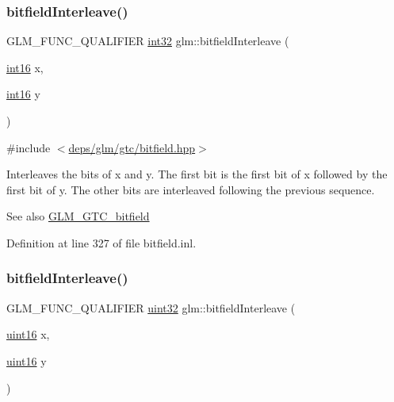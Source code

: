 \subsubsection{\texorpdfstring{bitfield\+Interleave()}{bitfieldInterleave()}\hspace{0.1cm}{\footnotesize\ttfamily [3/16]}}
{\footnotesize\ttfamily G\+L\+M\+\_\+\+F\+U\+N\+C\+\_\+\+Q\+U\+A\+L\+I\+F\+I\+ER \hyperlink{group__gtc__type__precision_ga632d8b25f6b61659f39ea4321fab92a4}{int32} glm\+::bitfield\+Interleave (\begin{DoxyParamCaption}\item[{\hyperlink{group__gtc__type__precision_ga2945a61d12771f8954994fcddf02b021}{int16}}]{x,  }\item[{\hyperlink{group__gtc__type__precision_ga2945a61d12771f8954994fcddf02b021}{int16}}]{y }\end{DoxyParamCaption})}



{\ttfamily \#include $<$\hyperlink{bitfield_8hpp}{deps/glm/gtc/bitfield.\+hpp}$>$}

Interleaves the bits of x and y. The first bit is the first bit of x followed by the first bit of y. The other bits are interleaved following the previous sequence.

\begin{DoxySeeAlso}{See also}
\hyperlink{group__gtc__bitfield}{G\+L\+M\+\_\+\+G\+T\+C\+\_\+bitfield} 
\end{DoxySeeAlso}


Definition at line 327 of file bitfield.\+inl.

\mbox{\label{group__gtc__bitfield_ga19ef8360379483e3ee245e89cb62ff93}} 
\subsubsection{\texorpdfstring{bitfield\+Interleave()}{bitfieldInterleave()}\hspace{0.1cm}{\footnotesize\ttfamily [4/16]}}
{\footnotesize\ttfamily G\+L\+M\+\_\+\+F\+U\+N\+C\+\_\+\+Q\+U\+A\+L\+I\+F\+I\+ER \hyperlink{group__gtc__type__precision_ga202b6a53c105fcb7e531f9b443518451}{uint32} glm\+::bitfield\+Interleave (\begin{DoxyParamCaption}\item[{\hyperlink{group__gtc__type__precision_gad8c2939e1fdd8e5828b31d95c52255d5}{uint16}}]{x,  }\item[{\hyperlink{group__gtc__type__precision_gad8c2939e1fdd8e5828b31d95c52255d5}{uint16}}]{y }\end{DoxyParamCaption})}



